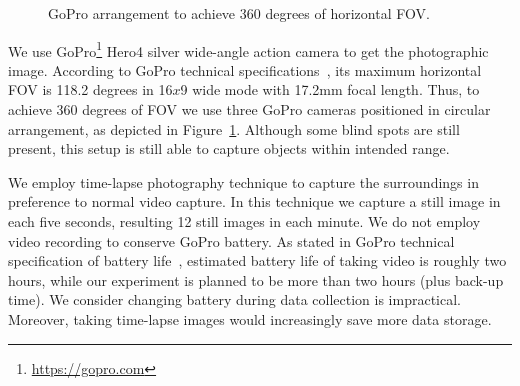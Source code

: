 	\begin{figure}[ht]
	\centering
	\hfill
	\caption{GoPro arrangement to achieve 360 degrees of horizontal \ac{FOV}.}
	\label{fig:gopro-placement}
	\end{figure}

	We use GoPro\footnote{\url{https://gopro.com}} Hero4 silver wide-angle action camera to get the photographic image. According to GoPro technical specifications~\cite{goprofieldofview}, its maximum horizontal \ac{FOV} is 118.2 degrees in 16$x$9 wide mode with 17.2mm focal length. Thus, to achieve 360 degrees of \ac{FOV} we use three GoPro cameras positioned in circular arrangement, as depicted in Figure~\ref{fig:gopro-placement}. Although some blind spots are still present, this setup is still able to capture objects within intended range.

	We employ time-lapse photography technique to capture the surroundings in preference to normal video capture. In this technique we capture a still image in each five seconds, resulting 12 still images in each minute. We do not employ video recording to conserve GoPro battery. As stated in GoPro technical specification of battery life~\cite{goprobattery}, estimated battery life of taking video is roughly two hours, while our experiment is planned to be more than two hours (plus back-up time). We consider changing battery during data collection is impractical. Moreover, taking time-lapse images would increasingly save more data storage.
	
